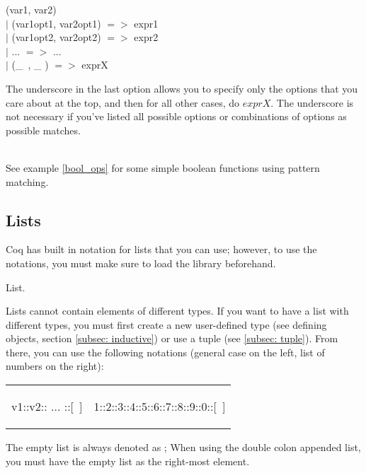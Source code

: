 \begin{code}
	\match (var1, var2) \with 					\\
	$\mid$ (var1opt1, var2opt1) $=>$ expr1		\\
	$\mid$ (var1opt2, var2opt2) $=>$ expr2		\\
	$\mid$ ...	$=>$ ...						\\
	$\mid$ (\_\ , \_ ) $=>$ exprX				\\
	\End
\end{code}

\noindent
The underscore in the last option allows you to specify only the options that you care about at the top, and then for all other cases, do $exprX$. The underscore is not necessary if you've listed all possible options or combinations of options as possible matches.

~\\ \noindent
See example \ref{bool_ops} for some simple boolean functions using pattern matching.





\subsection{Lists} \label{subsec: list} 
Coq has built in notation for lists that you can use; however, to use the notations, you must make sure to load the  library beforehand. 
\begin{code}
	\Load List.
\end{code}


\noindent
Lists cannot contain elements of different types. 
If you want to have a list with different types, you must first create a new user-defined type (see defining  objects, section \ref{subsec: inductive}) or use a tuple (see \ref{subsec: tuple}).
From there, you can use the following notations (general case on the left, list of numbers on the right):
\hspace{-1cm}
\begin{tabular}{p{8cm} p{8cm}}
\begin{code}
	v1::v2:: ... ::[\ ]
\end{code}
\begin{code}
	[ v1; ...; vN ]
\end{code}
&
\begin{code}
	1::2::3::4::5::6::7::8::9::0::[\ ]
\end{code}
\begin{code}
	[ 1; 2; 3; 4; 5; 6; 7; 8; 9; 0 ]
\end{code} 
\end{tabular}
The empty list is always denoted as \TT{[ ]}; When using the double colon appended list, you must have the empty list as the right-most element.

